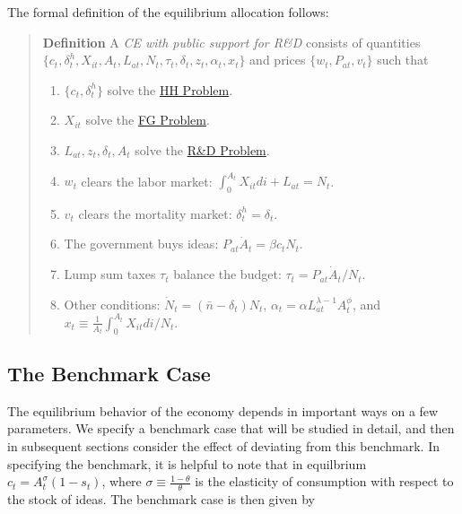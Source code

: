 \documentclass[12pt,twoside]{article}
\begin{document}
The formal definition of the equilibrium allocation follows:
{\color{ChadBlue}
\begin{quote}
{\bf {Definition}}
A {\it CE with public support for R\&D} consists of quantities $\{c_t,\delta_t ^h,
X_{it}, A_t, L_{at}, N_t, \tau_t, \delta_t, z_t, \alpha_t, x_t \}$ and
prices $\{w_t,P_{at},v_t\}$ such that
\begin{enumerate}
\item $\{c_t,\delta_t ^h\}$ solve the \hyperlink{HH}{HH Problem}.
\item $X_{it}$ solve the \hyperlink{FG}{FG Problem}.
\item $L_{at},z_t,\delta_t,A_t$ solve the \hyperlink{RD}{R\&D Problem}.
\item $w_t$ clears the labor market: $\int_0 ^{A_t} X_{it}di+L_{at}=N_t$.
\item $v_t$ clears the mortality market: $\delta_t ^h=\delta_t$.
\item The government buys ideas: $P_{at} \dot{A}_t = \beta c_t N_t$.
\item Lump sum taxes $\tau_t$ balance the budget: $\tau_t =P_{at}
  \dot{A}_t / N_t$.
\item Other conditions:
$\dot{N}_t = (\bar{n} -\delta_t)N_t$,
$\alpha_t = \alpha L_{at} ^{\lambda-1} A_t ^\phi$, and 
$x_t \equiv \frac{1}{A_t} \int_0 ^{A_t} X_{it} di / N_t$.
\end{enumerate}
\end{quote}}

\subsection{The Benchmark Case}

The equilibrium behavior of the economy depends in important ways on a
few parameters. We specify a benchmark case that will be studied in
detail, and then in subsequent sections consider the effect of deviating
from this benchmark. In specifying the benchmark, it is helpful to note
that in equilbrium $c_t = A_t ^\sigma (1-s_t)$, where $\sigma \equiv
\frac{1-\theta}{\theta}$ is the elasticity of consumption with respect
to the stock of ideas. The benchmark case is then given by
\end{document}

